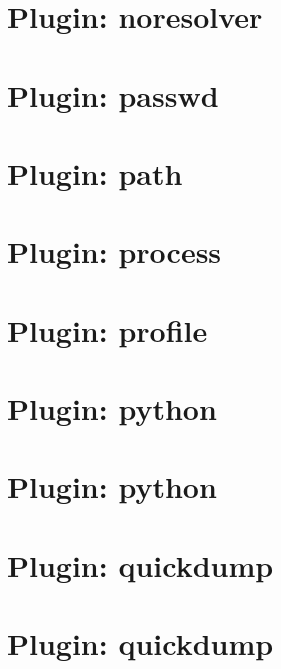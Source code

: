 \let\mypdfximage\pdfximage\def\pdfximage{\immediate\mypdfximage}\documentclass[twoside]{book}
\newcommand{\+}{\discretionary{\mbox{\scriptsize$\hookleftarrow$}}{}{}}
\begin{document}
\chapter{Plugin\+: noresolver}
\label{md_src_plugins_noresolver_README}

\chapter{Plugin\+: passwd}
\label{md_src_plugins_passwd_README}

\chapter{Plugin\+: path}
\label{md_src_plugins_path_README}

\chapter{Plugin\+: process}
\label{md_src_plugins_process_README}

\chapter{Plugin\+: profile}
\label{md_src_plugins_profile_README}

\chapter{Plugin\+: python}
\label{md_src_plugins_python_python_dns_README}

\chapter{Plugin\+: python}
\label{md_src_plugins_python_README}

\chapter{Plugin\+: quickdump}
\label{md_src_plugins_quickdump_benchmarks}

\chapter{Plugin\+: quickdump}
\label{md_src_plugins_quickdump_README}

\end{document}
